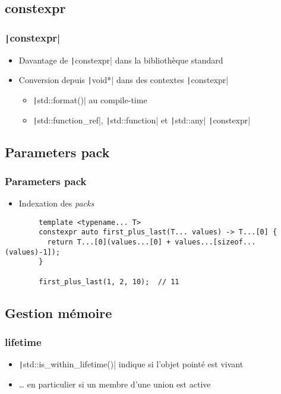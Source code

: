 \documentclass[C++.tex]{subfiles}
\begin{document}
\subsection*{constexpr}
\begin{frame}[fragile]
	\frametitle{\texttt|constexpr|}
	\begin{itemize}
		\item Davantage de \texttt|constexpr| dans la bibliothèque standard
		\item Conversion depuis \texttt|void*| dans des contextes \texttt|constexpr|
		\begin{itemize}
			\item \texttt|std::format()| au compile-time
			\item \texttt|std::function_ref|, \texttt|std::function| et \texttt|std::any| \texttt|constexpr|
		\end{itemize}
	\end{itemize}

\end{frame}

\subsection*{Parameters pack}
\begin{frame}[fragile]
	\frametitle{Parameters pack}
	\begin{itemize}
		\item Indexation des \textit{packs}
	\end{itemize}

	\begin{verbatim}
		template <typename... T>
		constexpr auto first_plus_last(T... values) -> T...[0] {
		  return T...[0](values...[0] + values...[sizeof...(values)-1]);
		}

		first_plus_last(1, 2, 10);  // 11
	\end{verbatim}

\end{frame}

\subsection*{Gestion mémoire}
\begin{frame}[fragile]
	\frametitle{lifetime}
	\begin{itemize}
		\item \texttt|std::is_within_lifetime()| indique si l'objet pointé est vivant
		\item \ldots{} en particulier si un membre d'une union est active
	\end{itemize}

\end{frame}
\end{document}
